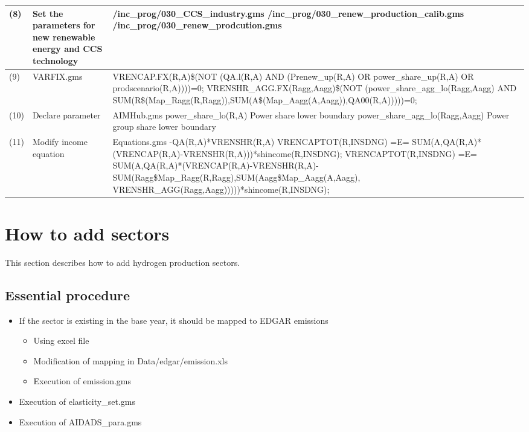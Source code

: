 \documentclass[10pt,a4paper,titlepage,dvipdfmx]{book}
\begin{document}
\begin{landscape}
\begin{tabularx}{\textwidth}{|
p{}|
p{}|
p{}|}
(8) & Set the parameters for new renewable energy and CCS technology & /inc\_prog/030\_CCS\_industry.gms \newline /inc\_prog/030\_renew\_production\_calib.gms \newline /inc\_prog/030\_renew\_prodcution.gms \\\hline 
(9) & VARFIX.gms & VRENCAP.FX(R,A)\$(NOT (QA.l(R,A) AND (Prenew\_up(R,A) OR power\_share\_up(R,A) OR prodscenario(R,A))))=0; \newline VRENSHR\_AGG.FX(Ragg,Aagg)\$(NOT (power\_share\_agg\_lo(Ragg,Aagg) AND SUM(R\$(Map\_Ragg(R,Ragg)),SUM(A\$(Map\_Aagg(A,Aagg)),QA00(R,A)))))=0; \\\hline 
(10) & Declare parameter & AIMHub.gms \newline power\_share\_lo(R,A)   Power share lower boundary \newline  power\_share\_agg\_lo(Ragg,Aagg)   Power group share lower boundary \\\hline 
(11) & Modify income equation &  Equations.gms \newline                -QA(R,A)*VRENSHR(R,A) \newline           VRENCAPTOT(R,INSDNG) =E= SUM(A,QA(R,A)*(VRENCAP(R,A)-VRENSHR(R,A)))*shincome(R,INSDNG); \newline     VRENCAPTOT(R,INSDNG) =E= SUM(A,QA(R,A)*(VRENCAP(R,A)-VRENSHR(R,A)-SUM(Ragg\$Map\_Ragg(R,Ragg),SUM(Aagg\$Map\_Aagg(A,Aagg), VRENSHR\_AGG(Ragg,Aagg)))))*shincome(R,INSDNG); \\\hline 
\end{tabularx}
\end{landscape}

\section{\label{sec:HowAddSec}How to add sectors}

This section describes how to add hydrogen production sectors.

\subsection{\label{subsec:EssPro}Essential procedure}


\begin{itemize}
\item If the sector is existing in the base year, it should be mapped to EDGAR emissions
\begin{itemize}
\item Using excel file
\item Modification of mapping in Data/edgar/emission.xls
\item Execution of emission.gms
\end{itemize}

\item Execution of elasticity\_set.gms
\item Execution of AIDADS\_para.gms
\end{itemize}
\end{document}
